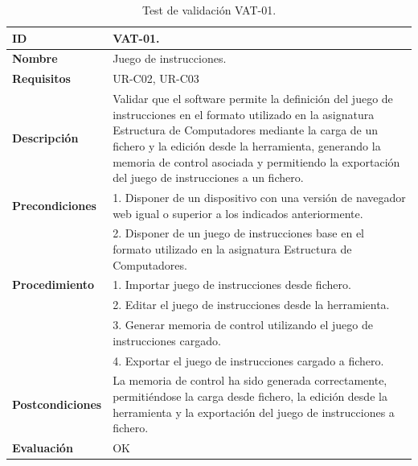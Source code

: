 \begin{center}
\begin{table}[htb]
\centering
\caption{Test de validación VAT-01.}
\begin{tabular}{@{}p{2.5cm} p{9cm}@{}} 
\toprule
\textbf{ID} 					& VAT-01. \\
\midrule
\textbf{Nombre} 				& Juego de instrucciones. \\
\midrule
\textbf{Requisitos} 		& UR-C02, UR-C03 \\
\midrule
\textbf{Descripción} 		& Validar que el \gls{software} permite la definición del juego de instrucciones en el formato utilizado en la asignatura Estructura de Computadores mediante la carga de un fichero y la edición desde la herramienta, generando la memoria de control asociada y permitiendo la exportación del juego de instrucciones a un fichero. \\
\midrule
\textbf{Precondiciones}		& 1. Disponer de un dispositivo con una versión de navegador web igual o superior a los indicados anteriormente. \\
											& 2. Disponer de un juego de instrucciones base en el formato utilizado en la asignatura Estructura de Computadores. \\
\midrule
\textbf{Procedimiento}		& 1. Importar juego de instrucciones desde fichero.\\
											& 2. Editar el juego de instrucciones desde la herramienta.\\
											& 3. Generar memoria de control utilizando el juego de instrucciones cargado.\\
											& 4. Exportar el juego de instrucciones cargado a fichero. \\
\midrule
\textbf{Postcondiciones} 		&  La memoria de control ha sido generada correctamente, permitiéndose la carga desde fichero, la edición desde la herramienta y la exportación del juego de instrucciones a fichero.\\
\midrule
\textbf{Evaluación} 			& OK \\
\bottomrule
\end{tabular}
\label{tab:vat-01}
\end{table}
\end{center}


